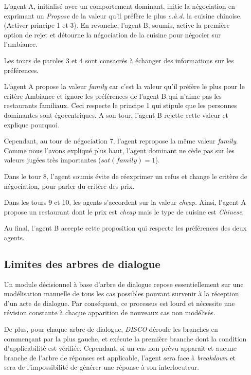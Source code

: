 	\par 
	L'agent A, initialisé avec un comportement dominant, initie la négociation en exprimant un \emph{Propose} de la valeur qu'il préfère le plus \textit{c.à.d.} la cuisine chinoise. (Activer principe 1 et 3). En revanche, l'agent B, soumis, active la première option de rejet et détourne la négociation de la cuisine pour négocier sur l'ambiance. 
	
	Les tours de paroles 3 et 4 sont consacrés à échanger des informations sur les préférences. 
	
	L'agent A propose la valeur \emph{family} car c'est la valeur qu'il préfère le plus pour le critère Ambiance et ignore les préférences de l'agent B qui n'aime pas les restaurants familiaux. Ceci respecte le principe 1 qui stipule que les personnes dominantes sont égocentriques. 
	A son tour, l'agent B rejette cette valeur et explique pourquoi. 
	
	Cependant, au tour de négociation 7, l'agent repropose la même valeur \emph{family}. Comme nous l'avons expliqué plus haut, l'agent dominant ne cède pas sur les valeurs jugées très importantes ($sat(family) =1$). 
	
	Dans le tour 8, l'agent soumis évite de réexprimer un refus et change le critère de négociation, pour parler du critère des prix.
	
	Dans les tours 9 et 10, les agents s'accordent sur la valeur \emph{cheap}. 
	Ainsi, l'agent A propose un restaurant dont le prix est \emph{cheap} mais le type de cuisine est \emph{Chinese}. 

	Au final, l'agent B accepte cette proposition qui respecte les préférences des deux agents.
	

	\subsection{Limites des arbres de dialogue}
	
	Un module décisionnel à base d'arbre de dialogue repose essentiellement sur une modélisation manuelle de tous les cas possibles pouvant survenir à la réception d'un acte de dialogue. Par conséquent, ce processus est lourd et nécessite une révision constante à chaque apparition de nouveaux cas non modélisés.
	
	De plus, pour chaque arbre de dialogue, \emph{DISCO} déroule les branches en commençant par la plus gauche, et exécute la première branche dont la condition d'applicabilité est vérifiée. Cependant, si un cas non prévu apparait et aucune branche de l'arbre de réponses est applicable, l'agent sera face à \textit{breakdown} et sera de l'impossibilité de générer une réponse à son interlocuteur. 
	

